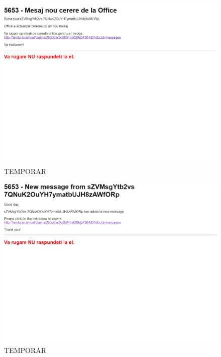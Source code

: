	\begin{figure}
		\includegraphics[width=\linewidth]{../imagini/message_mail_from_office.png}
		\caption{TEMPORAR}
		\label{fig:TEMP}
	\end{figure}
	\begin{figure}
		\includegraphics[width=\linewidth]{../imagini/message_mail_from_person.png}
		\caption{TEMPORAR}
		\label{fig:TEMP}
	\end{figure}
